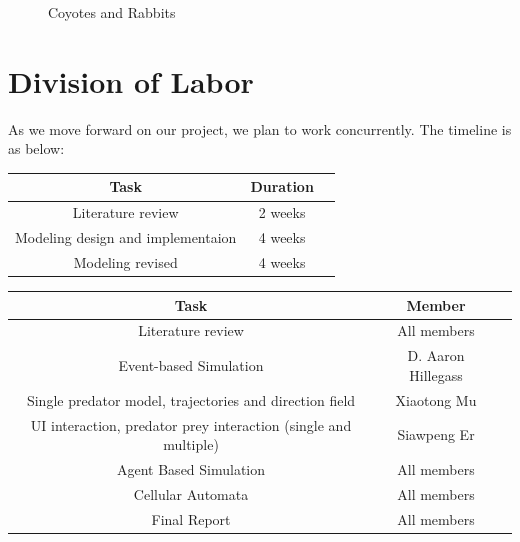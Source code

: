 \documentclass{article}
\begin{document}
\begin{normalsize}
\begin{figure}[H]
	\caption{Coyotes and Rabbits}
\end{figure}





		\section{Division of Labor}
		As we move forward on our project, we plan to work concurrently. The timeline is as below:
		
		\begin{center}
			\begin{tabular}{ |c|c|c| } 
				\hline
				Task & Duration  \\ 
				\hline
				Literature review & 2 weeks \\ 
				Modeling design and implementaion & 4 weeks \\ 
				Modeling revised & 4 weeks \\ 
				\hline
			\end{tabular}
		\end{center}
	
		\begin{center}
			\begin{tabular}{ |c|c|c| } 
				\hline
				Task & Member  \\ 
				\hline
				Literature review & All members\\			
				Event-based Simulation & D. Aaron Hillegass\\ 
				Single predator model, trajectories and direction field & Xiaotong Mu\\
				UI interaction, predator prey interaction (single and multiple) & Siawpeng Er\\
				Agent Based Simulation & All members\\
				Cellular Automata & All members\\
				Final Report & All members \\
				\hline
			\end{tabular}
		\end{center}

		
		
		
	\end{normalsize}
	
\end{document}
